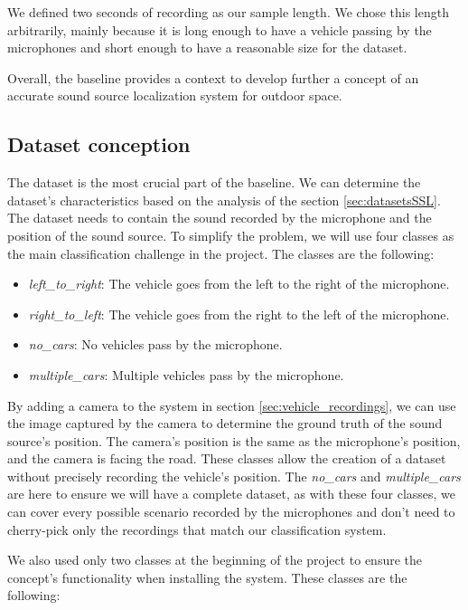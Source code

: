 We defined two seconds of recording as our sample length. We chose this length arbitrarily, mainly because it is long enough to have a vehicle passing by the microphones and short enough to have a reasonable size for the dataset.

Overall, the baseline provides a context to develop further a concept of an accurate sound source localization system for outdoor space.

\subsection{Dataset conception}
\label{sec:dataset_conception}

The dataset is the most crucial part of the baseline. We can determine the dataset's characteristics based on the analysis of the section \ref{sec:datasetsSSL}. The dataset needs to contain the sound recorded by the microphone and the position of the sound source. To simplify the problem, we will use four classes as the main classification challenge in the project. The classes are the following:

\begin{itemize}
    \item  \textit{left\_to\_right}: The vehicle goes from the left to the right of the microphone.
    \item  \textit{right\_to\_left}:  The vehicle goes from the right to the left of the microphone.
    \item  \textit{no\_cars}:  No vehicles pass by the microphone.
    \item  \textit{multiple\_cars}:  Multiple vehicles pass by the microphone.
\end{itemize}

By adding a camera to the system in section \ref{sec:vehicle_recordings}, we can use the image captured by the camera to determine the ground truth of the sound source's position. The camera's position is the same as the microphone's position, and the camera is facing the road. These classes allow the creation of a dataset without precisely recording the vehicle's position. The \textit{no\_cars} and \textit{multiple\_cars} are here to ensure we will have a complete dataset, as with these four classes, we can cover every possible scenario recorded by the microphones and don't need to cherry-pick only the recordings that match our classification system. 

We also used only two classes at the beginning of the project to ensure the concept's functionality when installing the system. These classes are the following:

